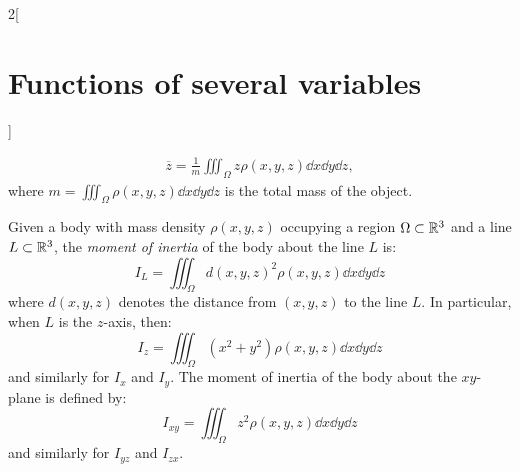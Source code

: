 \documentclass[../../../main_math.tex]{subfiles}
\begin{document}
\begin{multicols}{2}[\section{Functions of several variables}]
\begin{definition}
\begin{gather*}
      \overline{z}=\frac{1}{m}\iiint_\Omega z\rho(x,y,z)\dd{x}\dd{y}\dd{z},
    \end{gather*}
    where $\displaystyle m=\iiint_\Omega\rho(x,y,z)\dd{x}\dd{y}\dd{z}$ is the total mass of the object.
  \end{definition}
  \begin{definition}
    Given a body with mass density $\rho(x,y,z)$ occupying a region $\Omega\subset\mathbb{R}^3$ and a line $L\subset\mathbb{R}^3$, the \emph{moment of inertia} of the body about the line $L$ is: $$I_L=\iiint_\Omega d(x,y,z)^2\rho(x,y,z)\dd{x}\dd{y}\dd{z}$$ where $d(x,y,z)$ denotes the distance from $(x,y,z)$ to the line $L$. In particular, when $L$ is the $z$-axis, then: $$I_z=\iiint_\Omega (x^2+y^2)\rho(x,y,z)\dd{x}\dd{y}\dd{z}$$ and similarly for $I_x$ and $I_y$. The moment of inertia of the body about the $xy$-plane is defined by: $$I_{xy}=\iiint_\Omega z^2\rho(x,y,z)\dd{x}\dd{y}\dd{z}$$ and similarly for $I_{yz}$ and $I_{zx}.$
  \end{definition}

\end{multicols}
\end{document}
